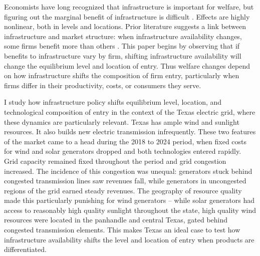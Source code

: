 \documentclass[12pt]{article}
\begin{document}
\begin{abstract}



\vspace{0.25in}


\vspace{0.1in}

\end{abstract}

\break
	
\onehalfspacing


Economists have long recognized that infrastructure is important for welfare, but figuring out the marginal benefit of infrastructure is difficult \citep{Fernald1999,DurantonTurner2011,BrancaccioKalouptsidiPapageorgiou2024}. Effects are highly nonlinear, both in levels and locations. Prior literature suggests a link between infrastructure and market structure: when infrastructure availability changes, some firms benefit more than others \citep{SniderWilliams2015,Trew2020}. This paper begins by observing that if benefits to infrastructure vary by firm, shifting infrastructure availability will change the equilibrium level and location of entry. Thus welfare changes depend on how infrastructure shifts the composition of firm entry, particularly when firms differ in their productivity, costs, or consumers they serve. 

I study how infrastructure policy shifts equilibrium level, location, and technological composition of entry in the context of the Texas electric grid, where these dynamics are particularly relevant. Texas has ample wind and sunlight resources. It also builds new electric transmission infrequently. These two features of the market came to a head during the 2018 to 2024 period, when fixed costs for wind and solar generators dropped and both technologies entered rapidly. Grid capacity remained fixed throughout the period and grid congestion increased. The incidence of this congestion was unequal: generators stuck behind congested transmission lines saw revenues fall, while generators in uncongested regions of the grid earned steady revenues. The geography of resource quality made this particularly punishing for wind generators -- while solar generators had access to reasonably high quality sunlight throughout the state, high quality wind resources were located in the panhandle and central Texas, gated behind congested transmission elements. This makes Texas an ideal case to test how infrastructure availability shifts the level and location of entry when products are differentiated.
\end{document}
